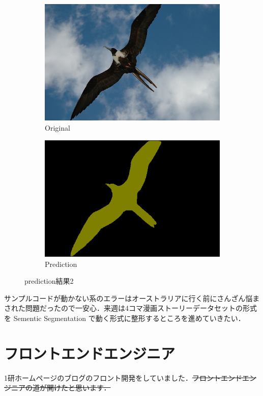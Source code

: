\documentclass[onecolumn]{ujarticle}   %
\begin{document}
	\begin{figure}[t]
		\centering
		\vspace{-7mm}
		\begin{subfigure}{0.45\columnwidth}
			\centering
			\hspace*{-5mm}
			\includegraphics[width=1.3\columnwidth]{000064_image.png}
			\caption{Original}
			\label{fig:original2}
		\end{subfigure}
		\begin{subfigure}{0.45\columnwidth}
			\centering
			\hspace*{-5mm}
			\includegraphics[width=1.3\columnwidth]{000064_prediction.png}
			\caption{Prediction}
			\label{fig:prediction_result2}
		\end{subfigure}
		\caption{prediction結果2}
		\label{fig:prediction2}
	\end{figure}


	サンプルコードが動かない系のエラーはオーストラリアに行く前にさんざん悩まされた問題だったので一安心．来週は4コマ漫画ストーリーデータセットの形式を Sementic Segmentation で動く形式に整形するところを進めていきたい．

	\section{フロントエンドエンジニア}\noindent
	1研ホームページのブログのフロント開発をしていました．\sout{フロントエンドエンジニアの道が開けたと思います．}

	
	
\end{document}
